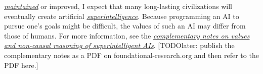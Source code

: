 \begin{itemize}
  \href{https://en.wikipedia.org/wiki/Software_maintenance}{\emph{maintained}}
  or improved, I expect that many long-lasting civilizations will
  eventually create artificial
  \href{https://en.wikipedia.org/wiki/Superintelligence}{\emph{superintelligence}}.
  Because programming an AI to pursue one's goals might be difficult,
  the values of such an AI may differ from those of humans. For more
  information, see the
  \href{https://docs.google.com/document/d/1o2Ee3dcYwzV0-1oH0L4Xop7mqRy14C-cu0ej-FA90ik/edit}{\emph{complementary
  notes on values and non-causal reasoning of superintelligent AIs}}.
  {[}TODOlater: publish the complementary notes as a PDF on
  foundational-research.org and then refer to the PDF here.{]}
\end{itemize}

